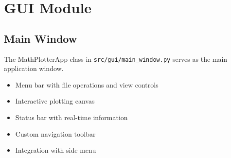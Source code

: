 \documentclass[12pt,a4paper]{report}
\begin{document}
\chapter{GUI Module}
\section{Main Window}
The MathPlotterApp class in \texttt{src/gui/main\_window.py} serves as the main application window.

\begin{tcolorbox}[title=Main Window Features]
\begin{itemize}
    \item Menu bar with file operations and view controls
    \item Interactive plotting canvas
    \item Status bar with real-time information
    \item Custom navigation toolbar
    \item Integration with side menu
\end{itemize}
\end{tcolorbox}
\end{document}
